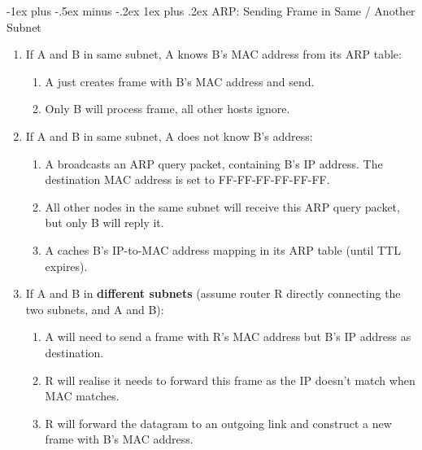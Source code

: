 \documentclass[12pt, landscape]{article}
\makeatletter
\renewcommand{\subsubsection}{\@startsection{subsubsection}{3}{0.1mm}%
                                {-1ex plus -.5ex minus -.2ex}%
                                {1ex plus .2ex}%
                                {\normalfont\small\bfseries}}
\makeatother
\begin{document}
\begin{multicols*}{3}
\null \null  \null  

\columnbreak

\subsubsection{ARP: Sending Frame in Same / Another Subnet}
\begin{enumerate}
\item If A and B in same subnet, A knows B’s MAC address from its ARP table:
	\begin{enumerate}
	\item A just creates frame with B’s MAC address and send.
	\item Only B will process frame, all other hosts ignore.
	\end{enumerate}
\item If A and B in same subnet, A does not know B’s address:
	\begin{enumerate}
	\item A broadcasts an ARP query packet, containing B’s IP address. The destination MAC address is set to FF-FF-FF-FF-FF-FF.
	\item All other nodes in the same subnet will receive this ARP query packet, but only B will reply it.
	\item A caches B’s IP-to-MAC address mapping in its ARP table (until TTL expires).
	\end{enumerate}
\item If A and B in \textbf{different subnets} (assume router R directly connecting the two subnets, and A and B):
	\begin{enumerate}
	\item A will need to send a frame with R’s MAC address but B’s IP address as destination.
	\item R will realise it needs to forward this frame as the IP doesn’t match when MAC matches.
	\item R will forward the datagram to an outgoing link and construct a new frame with B’s MAC address.
	\end{enumerate}
\end{enumerate}


\end{multicols*}
\end{document}
